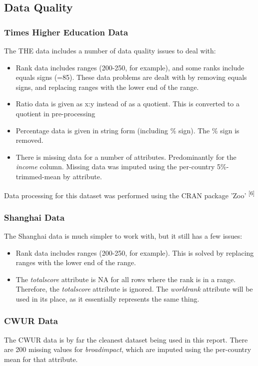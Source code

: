 \documentclass[12pt]{article}
\begin{document}
\subsection{Data Quality}

\subsubsection{Times Higher Education Data}
The THE data includes a number of data quality issues to deal with:
\begin{itemize}
\item Rank data includes ranges (200-250, for example), and some ranks include equals signs (=85). These data problems are dealt with by removing equals signs, and replacing ranges with the lower end of the range.
\item Ratio data is given as x:y instead of as a quotient. This is converted to a quotient in pre-processing
\item Percentage data is given in string form (including \% sign). The \% sign is removed.
\item There is missing data for a number of attributes. Predominantly for the \textit{income} column. Missing data was imputed using the per-country 5\%-trimmed-mean by attribute.
\end{itemize}
Data processing for this dataset was performed using the CRAN package 'Zoo' \textsuperscript{[6]}

\subsubsection{Shanghai Data}
The Shanghai data is much simpler to work with, but it still has a few issues:
\begin{itemize}
\item Rank data includes ranges (200-250, for example). This is solved by replacing ranges with the lower end of the range.
\item The \textit{total\textunderscore score} attribute is NA for all rows where the rank is in a range. Therefore, the \textit{total\textunderscore score} attribute is ignored. The \textit{world\textunderscore rank} attribute will be used in its place, as it essentially represents the same thing.
\end{itemize}


\subsubsection{CWUR Data}
The CWUR data is by far the cleanest dataset being used in this report. There are 200 missing values for \textit{broad\textunderscore impact}, which are imputed using the per-country mean for that attribute.
\end{document}
